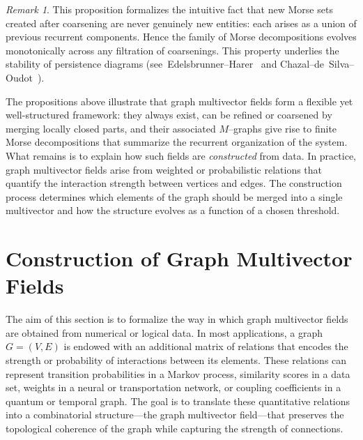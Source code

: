 \documentclass{article}
\theoremstyle{definition}
\theoremstyle{plain}
\theoremstyle{remark}
\newtheorem{remark}{Remark}
\newcommand{\1}{\mathbbm{1}}  %
\begin{document}
 

 
\begin{remark}
This proposition formalizes the intuitive fact that new Morse sets created
after coarsening are never genuinely new entities: each arises as a union
of previous recurrent components.  Hence the family of Morse
decompositions evolves monotonically across any filtration of coarsenings.
This property underlies the stability of persistence diagrams
(see~Edelsbrunner--Harer~\cite[Thm.~7.3]{EdelsbrunnerHarer2010CT} and
Chazal--de~Silva--Oudot~\cite[Thm.~3.1]{ChazalDeSilvaOudot2016Stability}).
\end{remark}







\medskip
\noindent
The propositions above illustrate that graph multivector fields form a
flexible yet well-structured framework: they always exist, can be
refined or coarsened by merging locally closed parts, and their
associated $M$--graphs give rise to finite Morse decompositions that
summarize the recurrent organization of the system.  What remains is to
explain how such fields are \emph{constructed} from data.  In practice,
graph multivector fields arise from weighted or probabilistic relations
that quantify the interaction strength between vertices and edges.  The
construction process determines which elements of the graph should be
merged into a single multivector and how the structure evolves as a
function of a chosen threshold.

\section{Construction of Graph Multivector Fields}
\label{sec:construction}

The aim of this section is to formalize the way in which graph
multivector fields are obtained from numerical or logical data.  In most
applications, a graph $G=(V,E)$ is endowed with an additional matrix of
relations that encodes the strength or probability of interactions
between its elements.  These relations can represent transition
probabilities in a Markov process, similarity scores in a data set,
weights in a neural or transportation network, or coupling coefficients
in a quantum or temporal graph.  The goal is to translate these
quantitative relations into a combinatorial structure---the graph
multivector field---that preserves the topological coherence of the
graph while capturing the strength of connections.
\end{document}
